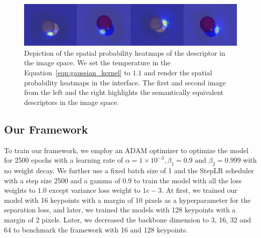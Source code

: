 \begin{figure}[htb]
    \centering
    \includegraphics[scale=0.25]{images/test_don.png}
    \caption{Depiction of the spatial probability heatmaps of the descriptor in the image space. We set the temperature in the Equation~\ref{eqn:gaussian_kernel} to $1.1$
        and render the spatial probability heatmaps in the interface. The first and second image from the left and the right highlights the semantically equivalent descriptors in the image space.}
    \label{fig:check_don}
\end{figure}


\subsection{Our Framework}

To train our framework, we employ an ADAM optimizer to optimize the model for 2500 epochs with a learning rate of
$\alpha = 1 \times 10^{-3}, \beta_1 = 0.9 \text{ and } \beta_2 = 0.999$ with no weight decay.
We further use a fixed batch size of 1 and the StepLR scheduler with a step size 2500 and a gamma of 0.9 to train the model with all the loss weights to $1.0$ except variance loss weight to $1e-3$.
At first, we trained our model with 16 keypoints with a margin of 10 pixels as a hyperparameter for the separation loss, and later, we trained the models with 128 keypoints with a margin of 2 pixels.
Later, we decreased the backbone dimension to 3, 16, 32 and 64 to benchmark the framework with 16 and 128 keypoints.


